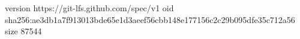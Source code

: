 version https://git-lfs.github.com/spec/v1
oid sha256:ae3db1a7f913013bde65e1d3aeef56cbb148e177156c2c29b095dfe35c712a56
size 87544
